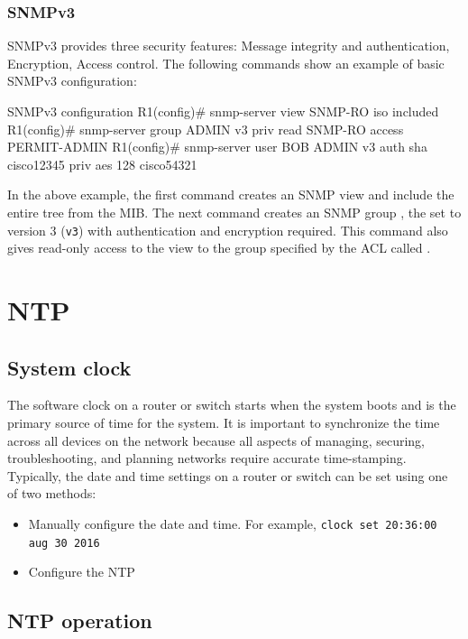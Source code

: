 \subsubsection{SNMPv3}

SNMPv3 provides three security features: Message integrity and authentication, Encryption, Access control. The following commands show an example of basic SNMPv3 configuration:

\begin{sexylisting}{SNMPv3 configuration}
R1(config)# snmp-server view SNMP-RO iso included                                    
R1(config)# snmp-server group ADMIN v3 priv read SNMP-RO access PERMIT-ADMIN         
R1(config)# snmp-server user BOB ADMIN v3 auth sha cisco12345 priv aes 128 cisco54321
\end{sexylisting}

In the above example, the first command creates an SNMP view  and include the entire  tree from the MIB. The next command creates an SNMP group , the set to version 3 (\verb|v3|) with authentication and encryption required. This command also gives read-only access to the view  to the group specified by the ACL called . 

\section{NTP}

\subsection{System clock}

The software clock on a router or switch starts when the system boots and is the primary source of time for the system. It is important to synchronize the time across all devices on the network because all aspects of managing, securing, troubleshooting, and planning networks require accurate time-stamping. Typically, the date and time settings on a router or switch can be set using one of two methods: 

\begin{itemize}
\item Manually configure the date and time. For example, \verb|clock set 20:36:00 aug 30 2016|
\item Configure the NTP
\end{itemize}

\subsection{NTP operation}

